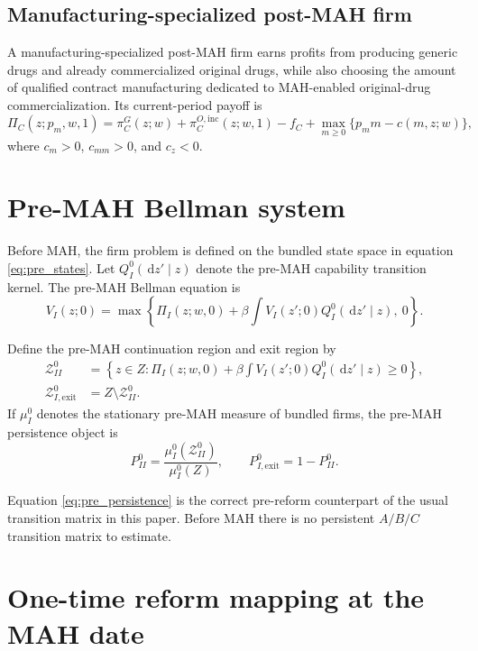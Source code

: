 \documentclass[12pt]{article}
\newcommand{\1}{\mathbf{1}}
\newcommand{\dd}{\,\mathrm{d}}
\begin{document}
\subsection{Manufacturing-specialized post-MAH firm}

A manufacturing-specialized post-MAH firm earns profits from producing generic drugs and already commercialized original drugs, while also choosing the amount of qualified contract manufacturing dedicated to MAH-enabled original-drug commercialization. Its current-period payoff is
\begin{equation}
\Pi_C(z;p_m,w,1)
=
\pi_C^G(z;w)
+\pi_C^{O,\mathrm{inc}}(z;w,1)
-f_C
+\max_{m\ge 0}\{p_mm-c(m,z;w)\},
\label{eq:PiC}
\end{equation}
where $c_m>0$, $c_{mm}>0$, and $c_z<0$.

\section{Pre-MAH Bellman system}

Before MAH, the firm problem is defined on the bundled state space in equation \eqref{eq:pre_states}. Let $Q_I^0(\dd z'\mid z)$ denote the pre-MAH capability transition kernel. The pre-MAH Bellman equation is
\begin{equation}
V_I(z;0)=\max\left\{\Pi_I(z;w,0)+\beta\int V_I(z';0)Q_I^0(\dd z'\mid z),\ 0\right\}.
\label{eq:VI}
\end{equation}

Define the pre-MAH continuation region and exit region by
\begin{align}
\mathcal Z_{II}^0 &= \left\{z\in Z: \Pi_I(z;w,0)+\beta\int V_I(z';0)Q_I^0(\dd z'\mid z)\ge 0\right\},\\
\mathcal Z_{I,\mathrm{exit}}^0 &= Z\setminus \mathcal Z_{II}^0.
\end{align}
If $\mu_I^0$ denotes the stationary pre-MAH measure of bundled firms, the pre-MAH persistence object is
\begin{equation}
P_{II}^0=\frac{\mu_I^0(\mathcal Z_{II}^0)}{\mu_I^0(Z)},
\qquad
P_{I,\mathrm{exit}}^0=1-P_{II}^0.
\label{eq:pre_persistence}
\end{equation}

Equation \eqref{eq:pre_persistence} is the correct pre-reform counterpart of the usual transition matrix in this paper. Before MAH there is no persistent $A/B/C$ transition matrix to estimate.

\section{One-time reform mapping at the MAH date}
\end{document}
